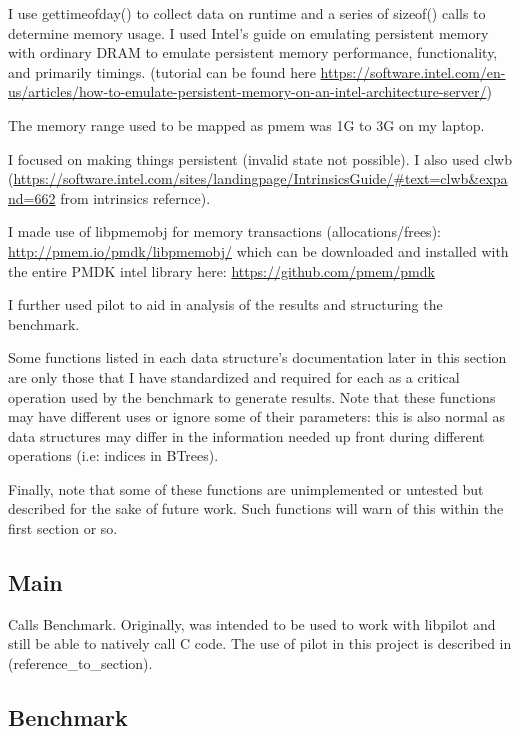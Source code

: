 \documentclass[twocolumn]{article}
\begin{document}
I use gettimeofday() to collect data on runtime and a series of sizeof() calls
to determine memory usage.  I used Intel's guide on emulating persistent memory
with ordinary DRAM to emulate persistent memory performance, functionality, and
primarily timings. (tutorial can be found here
\url{https://software.intel.com/en-us/articles/how-to-emulate-persistent-memory-on-an-intel-architecture-server/})

The memory range used to be mapped as pmem was 1G to 3G on my laptop.

I focused on making things persistent (invalid state not possible). I also
used clwb
(\url{https://software.intel.com/sites/landingpage/IntrinsicsGuide/#text=clwb&expand=662}
from intrinsics refernce).

I made use of libpmemobj for memory transactions (allocations/frees):
\url{http://pmem.io/pmdk/libpmemobj/}
which can be downloaded and installed with the entire PMDK intel library here:
\url{https://github.com/pmem/pmdk}

I further used pilot to aid in analysis of the results and structuring the
benchmark.

Some functions listed in each data structure's documentation later in this
section are only those that I have standardized and required for each as a
critical operation used by the benchmark to generate results. Note that these
functions may have different uses or ignore some of their parameters: this is
also normal as data structures may differ in the information needed up front
during different operations (i.e: indices in BTrees).

Finally, note that some of these functions are unimplemented or untested but
described for the sake of future work. Such functions will warn of this within
the first section or so.

\subsection{Main}

Calls Benchmark. Originally, was intended to be used to work with libpilot and
still be able to natively call C code. The use of pilot in this project is
described in (reference\_to\_section).

\subsection{Benchmark}
\end{document}

